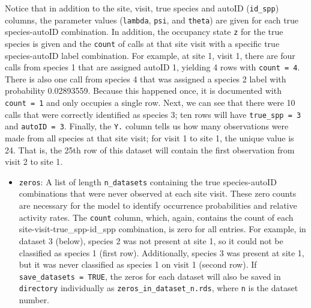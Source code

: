 \documentclass[
]{article}
\newenvironment{Shaded}{\begin{snugshade}}{\end{snugshade}}
\newcommand{\CommentTok}[1]{\textcolor[rgb]{0.56,0.35,0.01}{\textit{#1}}}
\newcommand{\DecValTok}[1]{\textcolor[rgb]{0.00,0.00,0.81}{#1}}
\newcommand{\FunctionTok}[1]{\textcolor[rgb]{0.13,0.29,0.53}{\textbf{#1}}}
\newcommand{\NormalTok}[1]{#1}
\newcommand{\OtherTok}[1]{\textcolor[rgb]{0.56,0.35,0.01}{#1}}
\newcommand{\SpecialCharTok}[1]{\textcolor[rgb]{0.81,0.36,0.00}{\textbf{#1}}}
\providecommand{\tightlist}{%
  \setlength{\itemsep}{0pt}\setlength{\parskip}{0pt}}
\begin{document}
Notice that in addition to the site, visit, true species and autoID (\texttt{id\_spp}) columns, the parameter values (\texttt{lambda}, \texttt{psi}, and \texttt{theta}) are given for each true species-autoID combination. In addition, the occupancy state \texttt{z} for the true species is given and the \texttt{count} of calls at that site visit with a specific true species-autoID label combination. For example, at site 1, visit 1, there are four calls from species 1 that are assigned autoID 1, yielding 4 rows with \texttt{count\ =\ 4}. There is also one call from species 4 that was assigned a species 2 label with probability 0.02893559. Because this happened once, it is documented with \texttt{count\ =\ 1} and only occupies a single row. Next, we can see that there were 10 calls that were correctly identified as species 3; ten rows will have \texttt{true\_spp\ =\ 3} and \texttt{autoID\ =\ 3}. Finally, the \texttt{Y.} column tells us how many observations were made from all species at that site visit; for visit 1 to site 1, the unique value is 24. That is, the 25th row of this dataset will contain the first observation from visit 2 to site 1.

\begin{itemize}
\tightlist
\item
  \texttt{zeros}: A list of length \texttt{n\_datasets} containing the true species-autoID combinations that were never observed at each site visit. These zero counts are necessary for the model to identify occurrence probabilities and relative activity rates. The \texttt{count} column, which, again, contains the count of each site-visit-true\_spp-id\_spp combination, is zero for all entries. For example, in dataset 3 (below), species 2 was not present at site 1, so it could not be classified as species 1 (first row). Additionally, species 3 was present at site 1, but it was never classified as species 1 on visit 1 (second row). If \texttt{save\_datasets\ =\ TRUE}, the zeros for each dataset will also be saved in \texttt{directory} individually as \texttt{zeros\_in\_dataset\_n.rds}, where \texttt{n} is the dataset number.
\end{itemize}

\linespread{1}

\begin{Shaded}
\end{Shaded}
\end{document}
